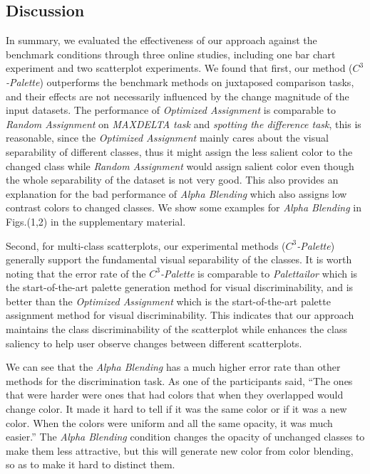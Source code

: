 {\subsection{Discussion}
\label{subsec:discussionEval}
In summary, we evaluated the effectiveness of our approach against the benchmark conditions through three online studies, including one bar chart experiment and two scatterplot experiments.
We found that first, our method (\emph{$C^3$-Palette}) outperforms the benchmark methods on juxtaposed comparison tasks, and their effects are not necessarily influenced by the change magnitude of the input datasets.
The performance of \emph{Optimized Assignment} is comparable to \emph{Random Assignment} on \emph{MAXDELTA task} and \emph{spotting the difference task}, this is reasonable, since the \emph{Optimized Assignment} mainly cares about the visual separability of different classes, thus it might assign the less salient color to the changed class while \emph{Random Assignment} would assign salient color even though the whole separability of the dataset is not very good. This also provides an explanation for the bad performance of \emph{Alpha Blending} which also assigns low contrast colors to changed classes. We show some examples for \emph{Alpha Blending} in Figs.(1,2) in the supplementary material.

Second, for multi-class scatterplots, our experimental methods (\emph{$C^3$-Palette}) generally support the fundamental visual separability of the classes. It is worth noting that the error rate of the \emph{$C^3$-Palette} is comparable to \emph{Palettailor} which is the start-of-the-art palette generation method for visual discriminability, and is better than the \emph{Optimized Assignment} which is the start-of-the-art palette assignment method for visual discriminability. This indicates that our approach maintains the class discriminability of the scatterplot while enhances the class saliency to help user observe changes between different scatterplots.

We can see that the \emph{Alpha Blending} has a much higher error rate than other methods for the discrimination task. As one of the participants said, ``The ones that were harder were ones that had colors that when they overlapped would change color. It made it hard to tell if it was the same color or if it was a new color. When the colors were uniform and all the same opacity, it was much easier.'' The \emph{Alpha Blending} condition changes the opacity of unchanged classes to make them less attractive, but this will generate new color from color blending, so as to make it hard to distinct them.

}
